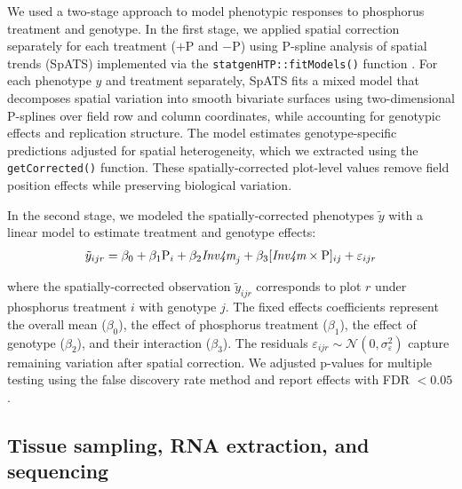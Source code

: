 \documentclass[9pt,twocolumn,twoside]{rilabRxiv}
\newcommand{\invfour}{\textit{Inv4m}\xspace}
\begin{document}
We used a two-stage approach to model phenotypic responses to phosphorus treatment and genotype.
In the first stage, we applied spatial correction separately for each treatment ($+$P and $-$P) using P-spline analysis of spatial trends (SpATS) \cite{rodriguez-alvarez2018} implemented via the \texttt{statgenHTP::fitModels()} function \cite{millet2025}.
For each phenotype $y$ and treatment separately, SpATS fits a mixed model that decomposes spatial variation into smooth bivariate surfaces using two-dimensional P-splines over field row and column coordinates, while accounting for genotypic effects and replication structure.
The model estimates genotype-specific predictions adjusted for spatial heterogeneity, which we extracted using the \texttt{getCorrected()} function.
These spatially-corrected plot-level values remove field position effects while preserving biological variation.

In the second stage, we modeled the spatially-corrected phenotypes $\tilde{y}$ with a linear model to estimate treatment and genotype effects:
\begin{eqnarray}
\label{eq:pheno_model}
\tilde{y}_{ijr} = \beta_0 + \beta_1 \text{P}_i + \beta_2 \textit{\invfour}_j + \beta_3 [\textit{\invfour} \times \text{P}]_{ij} + \varepsilon_{ijr}
\end{eqnarray}

where the spatially-corrected observation $\tilde{y}_{ijr}$ corresponds to plot $r$ under phosphorus treatment $i$ with genotype $j$.
The fixed effects coefficients represent the overall mean ($\beta_0$), the effect of phosphorus treatment ($\beta_1$), the effect of genotype ($\beta_2$), and their interaction ($\beta_3$).
The residuals $\varepsilon_{ijr} \sim \mathcal{N}(0, \sigma_\varepsilon^2)$ capture remaining variation after spatial correction.
We adjusted p-values for multiple testing using the false discovery rate method and report effects with FDR $< 0.05$.

\subsection*{Tissue sampling, RNA extraction, and sequencing}
\end{document}
